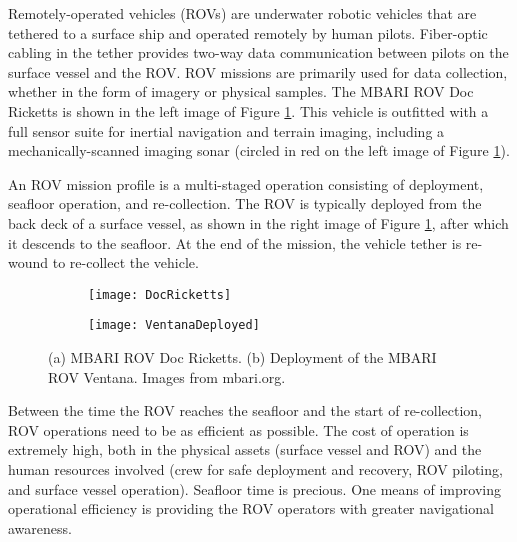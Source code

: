 Remotely-operated vehicles (ROVs) are underwater robotic vehicles that are tethered to a surface ship and operated remotely by human pilots.  
Fiber-optic cabling in the tether provides two-way data communication between pilots on the surface vessel and the ROV.
ROV missions are primarily used for data collection, whether in the form of imagery or physical samples. 
The MBARI ROV Doc Ricketts is shown in the left image of Figure \ref{fig:rovs}.
This vehicle is outfitted with a full sensor suite for inertial navigation and terrain imaging, including a mechanically-scanned imaging sonar (circled in red on the left image of Figure \ref{fig:rovs}). 

An ROV mission profile is a multi-staged operation consisting of deployment, seafloor operation, and re-collection.  
The ROV is typically deployed from the back deck of a surface vessel, as shown in the right image of Figure \ref{fig:rovs}, after which it descends to the seafloor.
At the end of the mission, the vehicle tether is re-wound to re-collect the vehicle.

\begin{figure}[!h!]
	\centering
	\begin{subfigure}[b]{0.408\textwidth}
		\texttt{[image: DocRicketts]}
		\caption{}
 	 \end{subfigure}
  	\centering
	\begin{subfigure}[b]{0.583\textwidth}
                \texttt{[image: VentanaDeployed]}
                \caption{}
  	\end{subfigure}
  	\caption{(a) MBARI ROV Doc Ricketts. (b) Deployment of the MBARI ROV Ventana.  Images from mbari.org.}
  	\label{fig:rovs}
\end{figure}

Between the time the ROV reaches the seafloor and the start of re-collection, ROV operations need to be as efficient as possible.
The cost of operation is extremely high, both in the physical assets (surface vessel and ROV) and the human resources involved (crew for safe deployment and recovery, ROV piloting, and surface vessel operation).
Seafloor time is precious.
One means of improving operational efficiency is providing the ROV operators with greater navigational awareness.

